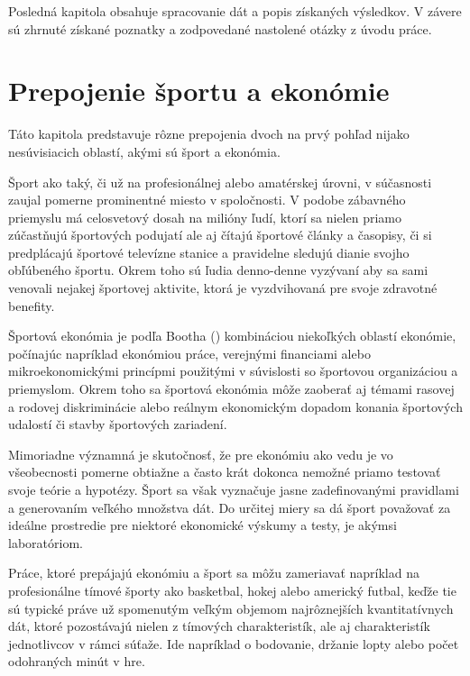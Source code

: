 \documentclass[
  digital, %
  twoside, %
  notable,   %
  lof,     %
  lot,     %
]{fithesis3}
\begin{document}
	Posledná kapitola obsahuje spracovanie dát a popis získaných výsledkov. V závere sú zhrnuté získané poznatky a zodpovedané nastolené otázky z úvodu práce.
	

	\chapter{Prepojenie športu a ekonómie}
	Táto kapitola predstavuje rôzne prepojenia dvoch na prvý pohľad nijako nesúvisiacich oblastí, akými sú šport a ekonómia.
	
	Šport ako taký, či už na profesionálnej alebo amatérskej úrovni, v súčasnosti zaujal pomerne prominentné miesto v spoločnosti. V podobe zábavného priemyslu má celosvetový dosah na milióny ľudí, ktorí sa nielen priamo zúčastňujú športových podujatí ale aj čítajú športové články a časopisy, či si predplácajú športové televízne stanice a pravidelne sledujú dianie svojho obľúbeného športu. \parencite{conrad2011} Okrem toho sú ľudia denno-denne vyzývaní aby sa sami venovali nejakej športovej aktivite, ktorá je vyzdvihovaná pre svoje zdravotné benefity.
	
	Športová ekonómia je podľa Bootha (\citeyear[s.~377]{booth2009}) kombináciou niekoľkých oblastí ekonómie, počínajúc napríklad ekonómiou práce, verejnými financiami alebo mikroekonomickými princípmi použitými v súvislosti so športovou organizáciou a priemyslom. Okrem toho sa športová ekonómia môže zaoberať aj témami rasovej a rodovej diskriminácie alebo reálnym ekonomickým dopadom konania športových udalostí či stavby športových zariadení. 
	
	Mimoriadne významná je skutočnosť, že pre ekonómiu ako vedu je vo všeobecnosti pomerne obtiažne a často krát dokonca nemožné  priamo testovať svoje teórie a hypotézy. Šport sa však vyznačuje jasne zadefinovanými pravidlami a generovaním veľkého množstva dát. Do určitej miery sa dá šport považovať za ideálne prostredie pre niektoré ekonomické výskumy a testy, je akýmsi laboratóriom.
	
	Práce, ktoré prepájajú ekonómiu a šport sa môžu zameriavať napríklad na profesionálne tímové športy ako basketbal, hokej alebo americký futbal, keďže tie sú typické práve už spomenutým veľkým objemom najrôznejších kvantitatívnych dát, ktoré pozostávajú nielen z tímových charakteristík, ale aj charakteristík jednotlivcov v rámci súťaže. Ide napríklad o bodovanie, držanie lopty alebo počet odohraných minút v hre.
	
\end{document}
